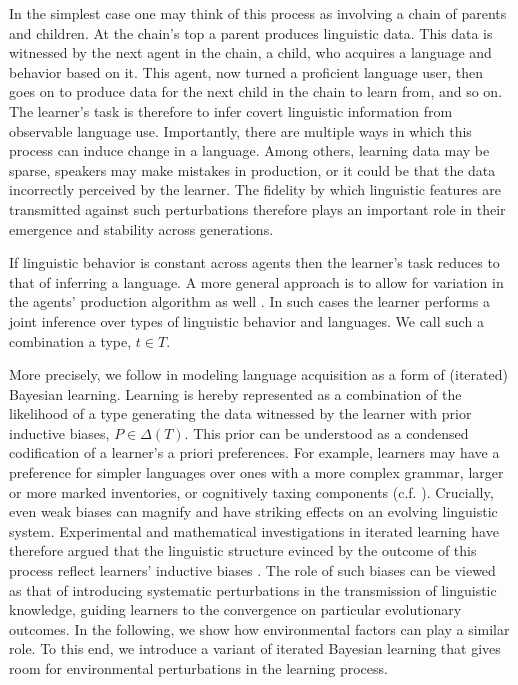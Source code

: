 \documentclass[10pt,a4paper]{article}
\begin{document}
In the simplest case one may think of this process as involving a chain of parents and children. At the chain's top a parent produces linguistic data. This data is witnessed by the next agent in the chain, a child, who acquires a language and behavior based on it. This agent, now turned a proficient language user, then goes on to produce data for the next child in the chain to learn from, and so on. The learner's task is therefore to infer covert linguistic information from observable language use. Importantly, there are multiple ways in which this process can induce change in a language. Among others, learning data may be sparse, speakers may make mistakes in production, or it could be that the data incorrectly perceived by the learner. The fidelity by which linguistic features are transmitted against such perturbations therefore plays an important role in their emergence and stability across generations.

If linguistic behavior is constant across agents then the learner's task reduces to that of inferring a language. A more general approach is to allow for variation in the agents' production algorithm as well \citep{brochhagen+etal:2016:CogSci}. In such cases the learner performs a joint inference over types of linguistic behavior and languages. We call such a combination a type, $t \in T$. 

More precisely, we follow \citet{griffiths+kalish:2007} in modeling language acquisition as a form of (iterated) Bayesian learning. Learning is hereby represented as a combination of the likelihood of a type generating the data witnessed by the learner with prior inductive biases, $P \in \Delta(T)$. This prior can be understood as a condensed codification of a learner's a priori preferences. For example, learners may have a preference for simpler languages over ones with a more complex grammar, larger or more marked inventories, or cognitively taxing components (c.f. \citealt{feldman:2000,chater+vitanyi:2003, kirby+etal:2015}). Crucially, even weak biases can magnify and have striking effects on an evolving linguistic system. Experimental and mathematical investigations in iterated learning have therefore argued that the linguistic structure evinced by the outcome of this process reflect learners' inductive biases \citep{kirby+etal:2007,kirby+etal:2014}. The role of such biases can be viewed as that of introducing systematic perturbations in the transmission of linguistic knowledge, guiding learners to the convergence on particular evolutionary outcomes. In the following, we show how environmental factors can play a similar role. To this end, we introduce a variant of iterated Bayesian learning that gives room for environmental perturbations in the learning process. 
\end{document}
